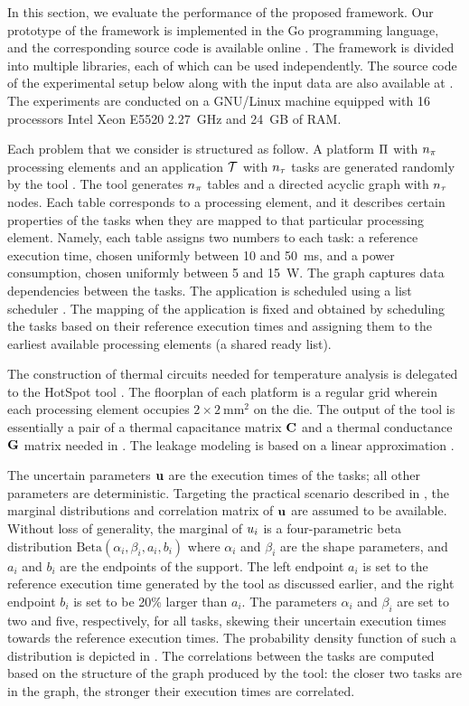 In this section, we evaluate the performance of the proposed framework. Our
prototype of the framework is implemented in the Go programming language, and
the corresponding source code is available online \cite{sources}. The framework
is divided into multiple libraries, each of which can be used independently. The
source code of the experimental setup below along with the input data are also
available at \cite{sources}. The experiments are conducted on a GNU/Linux
machine equipped with 16 processors Intel Xeon E5520 2.27~GHz and 24~GB of RAM.

Each problem that we consider is structured as follow. A platform $\Pi$ with
${n_\pi}$ processing elements and an application $\mathcal{T}$ with ${n_\tau}$ tasks are
generated randomly by the  tool \cite{dick1998}. The tool generates
${n_\pi}$ tables and a directed acyclic graph with ${n_\tau}$ nodes. Each table
corresponds to a processing element, and it describes certain properties of the
tasks when they are mapped to that particular processing element. Namely, each
table assigns two numbers to each task: a reference execution time, chosen
uniformly between 10 and 50~ms, and a power consumption, chosen uniformly
between 5 and 15~W. The graph captures data dependencies between the tasks. The
application is scheduled using a list scheduler \cite{adam1974}. The mapping of
the application is fixed and obtained by scheduling the tasks based on their
reference execution times and assigning them to the earliest available
processing elements (a shared ready list).

The construction of thermal  circuits needed for temperature analysis
is delegated to the HotSpot tool \cite{skadron2004}. The floorplan of each
platform is a regular grid wherein each processing element occupies $2 \times
2~\text{mm}^2$ on the die. The output of the tool is essentially a pair of a
thermal capacitance matrix $\mathbf{C}$ and a thermal conductance $\mathbf{G}$ matrix needed
in . The leakage modeling is based on a linear
approximation \cite{yang2013, ukhov2012, liu2007}.


The uncertain parameters $\mathbf{u}$ are the execution times of the tasks; all other
parameters are deterministic. Targeting the practical scenario described in
, the marginal distributions and correlation matrix
of $\mathbf{u}$ are assumed to be available. Without loss of generality, the marginal
of $u_i$ is a four-parametric beta distribution $\text{Beta}(\alpha_i, \beta_i,
a_i, b_i)$ where $\alpha_i$ and $\beta_i$ are the shape parameters, and $a_i$
and $b_i$ are the endpoints of the support. The left endpoint $a_i$ is set to
the reference execution time generated by the  tool as discussed
earlier, and the right endpoint $b_i$ is set to be 20\% larger than $a_i$. The
parameters $\alpha_i$ and $\beta_i$ are set to two and five, respectively, for
all tasks, skewing their uncertain execution times towards the reference
execution times. The probability density function of such a distribution is
depicted in . The correlations between the tasks are computed based
on the structure of the graph produced by the  tool: the closer two
tasks are in the graph, the stronger their execution times are correlated.

